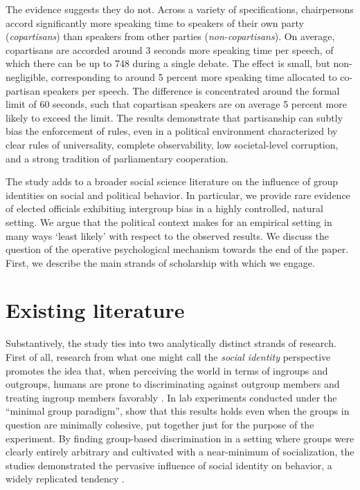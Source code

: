 \documentclass[12pt,a4paper]{article}
\begin{document}
The evidence suggests they do not. Across a variety of specifications, chairpersons accord significantly more speaking time to speakers of their own party (\textit{copartisans}) than speakers from other parties (\textit{non-copartisans}). On average, copartisans are accorded around 3 seconds more speaking time per speech, of which there can be up to 748 during a single debate. The effect is small, but non-negligible, corresponding to around 5 percent more speaking time allocated to co-partisan speakers per speech. The difference is concentrated around the formal limit of 60 seconds, such that copartisan speakers are on average 5 percent more likely to exceed the limit. The results demonstrate that partisanship can subtly bias the enforcement of rules, even in a political environment characterized by clear rules of universality, complete observability, low societal-level corruption, and a strong tradition of parliamentary cooperation.

The study adds to a broader social science literature on the influence of group identities on social and political behavior. In particular, we provide rare evidence of elected officials exhibiting intergroup bias in a highly controlled, natural setting. We argue that the political context makes for an empirical setting in many ways `least likely' with respect to the observed results. We discuss the question of the operative psychological mechanism towards the end of the paper. First, we describe the main strands of scholarship with which we engage. 

\section{Existing literature}

Substantively, the study ties into two analytically distinct strands of research. First of all, research from what one might call the \textit{social identity} perspective promotes the idea that, when perceiving the world in terms of ingroups and outgroups, humans are prone to discriminating against outgroup members and treating ingroup members favorably \citep{Hewstone2002}. In lab experiments conducted under the ``minimal group paradigm'', \cite{Tajfel1979,Tajfel1986} show that this results holds even when the groups in question are minimally cohesive, put together just for the purpose of the experiment. By finding group-based discrimination in a setting where groups were clearly entirely arbitrary and cultivated with a near-minimum of socialization, the studies demonstrated the pervasive influence of social identity on behavior, a widely replicated tendency \citep{Brewer1979, Abrams1990, Brown2000, Chen2009}. 
\end{document}
